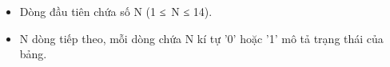 \begin{itemize}
	\item     Dòng đầu tiên chứa số N (1 ≤ N ≤ 14).   
	\item     N dòng tiếp theo, mỗi dòng chứa N kí tự '0' hoặc '1' mô tả trạng thái của bảng.   
\end{itemize}